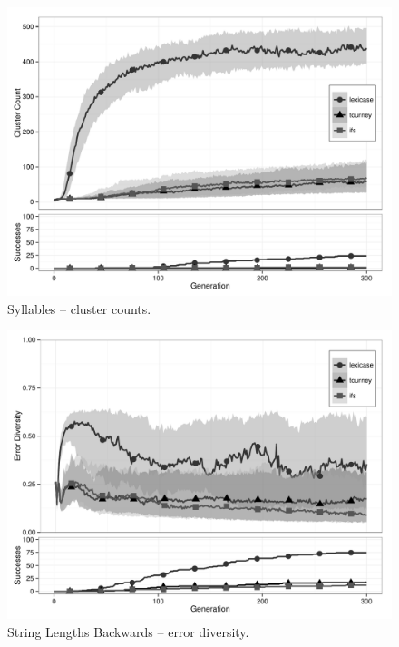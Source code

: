 \begin{figure}[p] %
\centering
\includegraphics[width=11.5cm]{syllables-cluster.pdf}
\caption{Syllables -- cluster counts.}
\label{syllablesClu}
\end{figure}

\begin{figure}[p] %
\centering
\includegraphics[width=11.5cm]{string-lengths-backwards-diversity.pdf}
\caption{String Lengths Backwards -- error diversity.}
\label{string-lengths-backwardsDiv}
\end{figure}

